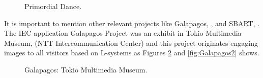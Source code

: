 \begin{figure}
\captionsetup{justification=centering,margin=2cm}
\centering
\setlength\fboxsep{0pt}
\setlength\fboxrule{0.7pt}
\caption{Primordial Dance.}
\label{fig:PrimordialD}
\end{figure}


It is important to mention other relevant projects like Galapagos,
\cite{sims1997interactivity}, and SBART, \cite{unemi2000sbart}. The IEC
application Galapagos Project was an exhibit in Tokio Multimedia Museum, (NTT
Intercommunication Center) and this project originates engaging images to all
visitors based on L-systems as Figures \ref{fig:Galapagos1} and \ref{fig:Galapagos2}
shows.

\begin{figure}
\captionsetup{justification=centering,margin=2cm}
\centering
\setlength\fboxsep{0pt}
\setlength\fboxrule{0.7pt}
\caption{Galapagos: Tokio Multimedia Museum.}
\label{fig:Galapagos1}
\end{figure}

